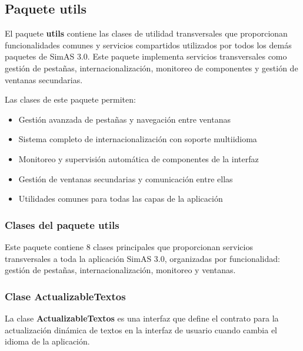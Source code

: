 \subsection{Paquete utils}

El paquete \textbf{utils} contiene las clases de utilidad transversales que proporcionan funcionalidades comunes y servicios compartidos utilizados por todos los demás paquetes de SimAS 3.0. Este paquete implementa servicios transversales como gestión de pestañas, internacionalización, monitoreo de componentes y gestión de ventanas secundarias.

Las clases de este paquete permiten:
\begin{itemize}
    \item Gestión avanzada de pestañas y navegación entre ventanas
    \item Sistema completo de internacionalización con soporte multiidioma
    \item Monitoreo y supervisión automática de componentes de la interfaz
    \item Gestión de ventanas secundarias y comunicación entre ellas
    \item Utilidades comunes para todas las capas de la aplicación
\end{itemize}

\subsubsection{Clases del paquete utils}

Este paquete contiene 8 clases principales que proporcionan servicios transversales a toda la aplicación SimAS 3.0, organizadas por funcionalidad: gestión de pestañas, internacionalización, monitoreo y ventanas.

\subsubsection{Clase ActualizableTextos}

La clase \textbf{ActualizableTextos} es una interfaz que define el contrato para la actualización dinámica de textos en la interfaz de usuario cuando cambia el idioma de la aplicación.

